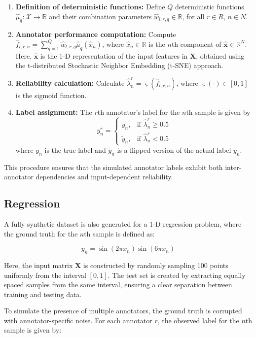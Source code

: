\begin{enumerate}
\item \textbf{Definition of deterministic functions:} Define $Q$
deterministic functions $\hat{\mu}_q : \mathcal{X} \rightarrow
\mathbb{R}$ and their combination parameters $\hat{w}_{l,r,q} \in
\mathbb{R}$, for all $r \in R$, $n \in N$.
\item \textbf{Annotator performance computation:} Compute
$\hat{f}_{l,r,n} = \sum_{q=1}^{Q} \hat{w}_{l,r,q}
\hat{\mu}_q(\hat{x}_n)$, where $\hat{x}_n \in \mathbb{R}$ is the
$n$th component of $\hat{\mathbf{x}} \in \mathbb{R}^N$. Here,
$\hat{\mathbf{x}}$ is the 1-D representation of the input features in
$\mathbf{X}$, obtained using the t-distributed Stochastic Neighbor
Embedding (t-SNE) approach.
\item \textbf{Reliability calculation:} Calculate $\hat{\lambda}^r_n
= \varsigma(\hat{f}_{l,r,n})$, where $\varsigma(\cdot) \in [0,1]$ is
the sigmoid function.
\item \textbf{Label assignment:} The $r$th annotator's label for the
$n$th sample is given by
\[
  y^r_n =
  \begin{cases}
    y_n, & \text{if } \hat{\lambda}^r_n \geq 0.5 \\
    \tilde{y}_n, & \text{if } \hat{\lambda}^r_n < 0.5
  \end{cases}
\]
where $y_n$ is the true label and $\tilde{y}_n$ is a flipped version
of the actual label $y_n$.
\end{enumerate}

This procedure ensures that the simulated annotator labels exhibit
both inter-annotator dependencies and input-dependent reliability.

\subsection{Regression}

A fully synthetic dataset is also generated for a 1-D regression problem,
where the ground truth for the $n$th sample is defined as:

\[
y_n = \sin(2\pi x_n) \sin(6\pi x_n)
\]

Here, the input matrix $\mathbf{X}$ is constructed by randomly
sampling 100 points uniformly from the interval $[0, 1]$. The test
set is created by extracting equally spaced samples from the same
interval, ensuring a clear separation between training and testing data.

To simulate the presence of multiple annotators, the ground truth is
corrupted with annotator-specific noise. For each annotator $r$, the
observed label for the $n$th sample is given by:

